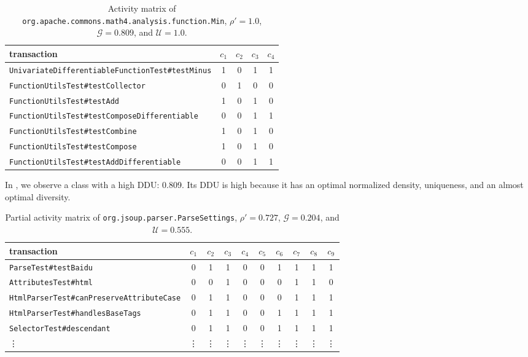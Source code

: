 \documentclass[twoside,a4paper,11pt]{memoir}
\begin{document}
\begin{table}[]
\scriptsize
\centering
\caption{Activity matrix of \texttt{org.apache.commons.math4.analysis.function.Min}, $\rho' = 1.0$, $\mathcal{G} = 0.809$, and $\mathcal{U} = 1.0$.}
\label{tab:min}
\begin{tabular}{l|cccc}
transaction & $c_1$ & $c_2$ & $c_3$ & $c_4$ \\ \hline
\texttt{UnivariateDifferentiableFunctionTest\#testMinus} & 1 & 0 & 1 & 1 \\
\texttt{FunctionUtilsTest\#testCollector} & 0 & 1 & 0 & 0 \\
\texttt{FunctionUtilsTest\#testAdd} & 1 & 0 & 1 & 0 \\
\texttt{FunctionUtilsTest\#testComposeDifferentiable} & 0 & 0 & 1 & 1 \\
\texttt{FunctionUtilsTest\#testCombine} & 1 & 0 & 1 & 0 \\
\texttt{FunctionUtilsTest\#testCompose} & 1 & 0 & 1 & 0 \\
\texttt{FunctionUtilsTest\#testAddDifferentiable} & 0 & 0 & 1 & 1
\end{tabular}
\end{table}

In , we observe a class with a high DDU: 0.809.
Its DDU is high because it has an optimal normalized density, uniqueness, and an almost optimal diversity.

\begin{table}[]
\scriptsize
\centering
\caption{Partial activity matrix of \texttt{org.jsoup.parser.ParseSettings}, $\rho' = 0.727$, $\mathcal{G} = 0.204$, and $\mathcal{U} = 0.555$.}
\label{tab:parsesettings}
\begin{tabular}{l|ccccccccc}
transaction & $c_1$ & $c_2$ & $c_3$ & $c_4$ & $c_5$ & $c_6$ & $c_7$ & $c_8$ & $c_9$ \\ \hline
\texttt{ParseTest\#testBaidu} & 0 & 1 & 1 & 0 & 0 & 1 & 1 & 1 & 1 \\
\texttt{AttributesTest\#html} & 0 & 0 & 1 & 0 & 0 & 0 & 1 & 1 & 0 \\
\texttt{HtmlParserTest\#canPreserveAttributeCase} & 0 & 1 & 1 & 0 & 0 & 0 & 1 & 1 & 1 \\
\texttt{HtmlParserTest\#handlesBaseTags} & 0 & 1 & 1 & 0 & 0 & 1 & 1 & 1 & 1 \\
\texttt{SelectorTest\#descendant} & 0 & 1 & 1 & 0 & 0 & 1 & 1 & 1 & 1 \\
\vdots & \vdots & \vdots & \vdots & \vdots & \vdots & \vdots & \vdots & \vdots & \vdots
\end{tabular}
\end{table}
\end{document}
